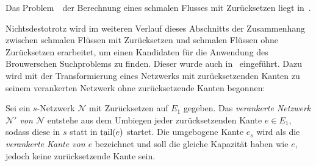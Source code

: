 \begin{conjecture}
	Das Problem~\probTFwR\ der Berechnung eines schmalen Flusses mit Zurücksetzen liegt in~\PPAD.
\end{conjecture}

Nichtsdestotrotz wird im weiteren Verlauf dieses Abschnitts der Zusammenhang zwischen schmalen Flüssen mit Zurück\-setzen und schmalen Flüssen ohne Zurück\-setzen erarbeitet, um einen Kandidaten für die Anwendung des Brouwerschen Suchproblems zu finden.
Dieser wurde auch in~\cite{Koch2012} eingeführt.
Dazu wird mit der Transformierung eines Netzwerks mit zurück\-setzenden Kanten zu seinem verankerten Netzwerk ohne zurücksetzende Kanten begonnen:

\begin{definition}
	Sei ein $s$-Netzwerk $\mathcal{N}$ mit Zurücksetzen auf $E_1$ gegeben.
	Das \emph{verankerte Netzwerk $\mathcal{N}'$ von $\mathcal{N}$} entstehe aus dem Umbiegen jeder zurücksetzenden Kante $e\in E_1$, sodass diese in $s$ statt in $\operatorname{tail}(e)$ startet.
	Die umgebogene Kante $e_s$ wird als die \emph{verankerte Kante von $e$} bezeichnet und soll die gleiche Kapazität haben wie $e$, jedoch keine zurücksetzende Kante sein.
\end{definition}


